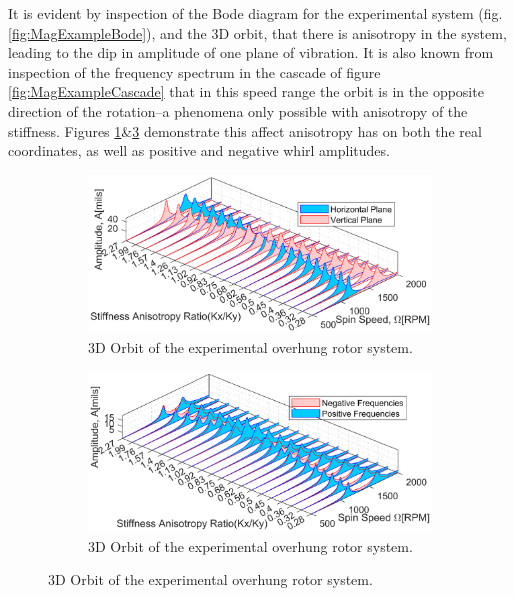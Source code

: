 It is evident by inspection of the Bode diagram for the experimental system (fig.\ref{fig:MagExampleBode}), and the 3D orbit, that there is anisotropy in the system, leading to the dip in amplitude of one plane of vibration. It is also known from inspection of the frequency spectrum in the cascade of figure \ref{fig:MagExampleCascade} that in this speed range the orbit is in the opposite direction of the rotation--a phenomena only possible with anisotropy of the stiffness. Figures \ref{fig:HorVertStiffAniCompare}\&\ref{fig:PosNegStiffAniCompare} demonstrate this affect anisotropy has on both the real coordinates, as well as positive and negative whirl amplitudes. \par 
\begin{figure}
\begin{subfigure}{\textwidth/2}
	\centering
	\includegraphics[width=\linewidth]{./figures/MagExampleHorVertStiffAniCompare.eps}
	\caption{3D Orbit of the experimental overhung rotor system.}
	\label{fig:HorVertStiffAniCompare}
\end{subfigure}
\begin{subfigure}{\textwidth/2}
	\centering
	\includegraphics[width=\linewidth]{./figures/MagExamplePosNegStiffAniCompare.eps}
	\caption{3D Orbit of the experimental overhung rotor system.}
	\label{fig:PosNegStiffAniCompare}
\end{subfigure}
\end{figure}
